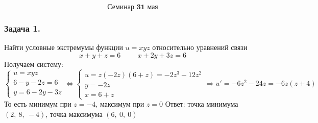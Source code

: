 \documentclass[12pt, letterpaper, twoside]{article}
\begin{document}
\[\textbf{Семинар 31 мая}\]
\subsubsection*{Задача 1.}
Найти условные экстремумы функции $u = xyz$ относительно уравнений связи
\[x + y + z = 6\hspace{1cm} x + 2y  + 3z = 6\]
Получаем систему:\\
$\begin{cases}
    u = xyz\\
    6 - y - 2z = 6\\
    y = 6 - 2y - 3z
\end{cases}\Leftrightarrow \begin{cases}
    u = z(-2z)(6 + z) = -2z^3 - 12z^2\\
    y = -2z\\
    x = 6 + z
\end{cases}\Rightarrow u' = -6z^2 - 24z = -6z(z + 4)$\\
То есть минимум при $z = -4$, максимум при $z = 0$
Ответ: точка минимума $(2,\ 8,\ -4)$, точка максимума $(6,\ 0,\ 0)$
\end{document}
